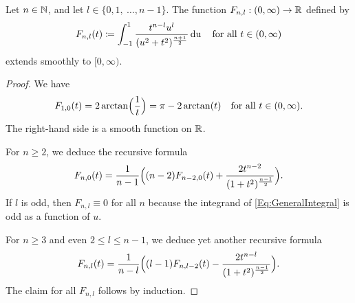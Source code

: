\documentclass[\MainFolder/Text.tex]{subfiles}
\begin{document}
%
%
\begin{Lem} \label{Lem:GeneralIntegralExtension}
Let $n\in \mathbb{N}$, and let $l\in\{ 0, 1,~\dotsc, n-1\}$. The function $F_{n,l}: (0,\infty)\rightarrow \mathbb{R}$ defined by
\begin{equation}\label{Eq:GeneralIntegral}
F_{n,l}(t) \coloneqq \int_{-1}^1 \frac{t^{n-l} u^l}{(u^2+t^2)^{\frac{n+1}{2}}} \operatorname{du}\quad\text{for all }t\in(0,\infty)
\end{equation}
extends smoothly to $[0,\infty)$.
\end{Lem} 
\begin{proof}
We have
\[ F_{1,0}(t) = 2 \arctan\Bigl(\frac{1}{t}\Bigr)=\pi - 2 \arctan(t) \quad\text{for all }t\in (0,\infty). \]
The right-hand side is a smooth function on $\mathbb{R}$.

For $n\ge 2$, we deduce the recursive formula
\[ F_{n,0}(t) = \frac{1}{n-1}\Bigl((n-2)F_{n-2,0}(t)+\frac{2 t^{n-2}}{(1+t^2)^{\frac{n-1}{2}}}\Bigr).\]
If $l$ is odd, then $F_{n,l}\equiv 0$ for all $n$ because the integrand of \eqref{Eq:GeneralIntegral} is odd as a function of $u$.

For $n\ge 3$ and even $2\le l \le n-1$, we deduce yet another recursive formula
\[  F_{n,l}(t) = \frac{1}{n-l}\Bigl((l-1) F_{n,l-2}(t) -  \frac{2 t^{n-l}}{(1+t^2)^{\frac{n-1}{2}}} \Bigr).
\]
The claim for all $F_{n,l}$ follows by induction.
\end{proof}
\end{document}
